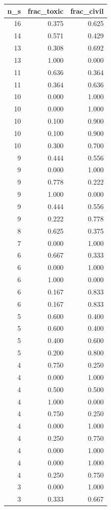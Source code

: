 \begin{tabular}{rrr}
\toprule
n_s & frac_toxic & frac_civil \\
\midrule
16 & 0.375 & 0.625 \\
14 & 0.571 & 0.429 \\
13 & 0.308 & 0.692 \\
13 & 1.000 & 0.000 \\
11 & 0.636 & 0.364 \\
11 & 0.364 & 0.636 \\
10 & 0.000 & 1.000 \\
10 & 0.000 & 1.000 \\
10 & 0.100 & 0.900 \\
10 & 0.100 & 0.900 \\
10 & 0.300 & 0.700 \\
9 & 0.444 & 0.556 \\
9 & 0.000 & 1.000 \\
9 & 0.778 & 0.222 \\
9 & 1.000 & 0.000 \\
9 & 0.444 & 0.556 \\
9 & 0.222 & 0.778 \\
8 & 0.625 & 0.375 \\
7 & 0.000 & 1.000 \\
6 & 0.667 & 0.333 \\
6 & 0.000 & 1.000 \\
6 & 1.000 & 0.000 \\
6 & 0.167 & 0.833 \\
6 & 0.167 & 0.833 \\
5 & 0.600 & 0.400 \\
5 & 0.600 & 0.400 \\
5 & 0.400 & 0.600 \\
5 & 0.200 & 0.800 \\
4 & 0.750 & 0.250 \\
4 & 0.000 & 1.000 \\
4 & 0.500 & 0.500 \\
4 & 1.000 & 0.000 \\
4 & 0.750 & 0.250 \\
4 & 0.000 & 1.000 \\
4 & 0.250 & 0.750 \\
4 & 0.000 & 1.000 \\
4 & 0.000 & 1.000 \\
4 & 0.250 & 0.750 \\
3 & 0.000 & 1.000 \\
3 & 0.333 & 0.667 \\

\end{tabular}
